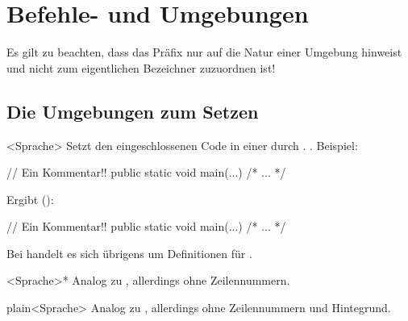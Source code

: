 \documentclass{sopra-base}
\begin{document}
\section{Befehle- und Umgebungen}

Es gilt zu beachten, dass das Präfix  nur auf die Natur einer Umgebung hinweist und nicht zum eigentlichen Bezeichner zuzuordnen ist!


\subsection{Die Umgebungen zum Setzen}


\begin{environment}{<Sprache>}{}
    Setzt den eingeschlossenen Code in einer durch  . .
    Beispiel:\smallskip\\ %
    \begin{latex}
\begin{java}
// Ein Kommentar!!
public static void main(...){ /* ... */ }
\end{java}
    \end{latex}
    Ergibt ():
\begin{java}
// Ein Kommentar!!
public static void main(...){ /* ... */ }
\end{java}
    Bei  handelt es sich übrigens um Definitionen für .
\end{environment}

\begin{environment}{<Sprache>*}{}
    Analog zu , allerdings ohne Zeilennummern.
\end{environment}

\begin{environment}{plain<Sprache>}{}
    Analog zu , allerdings ohne Zeilennummern und Hintegrund.
\end{environment}
\end{document}
